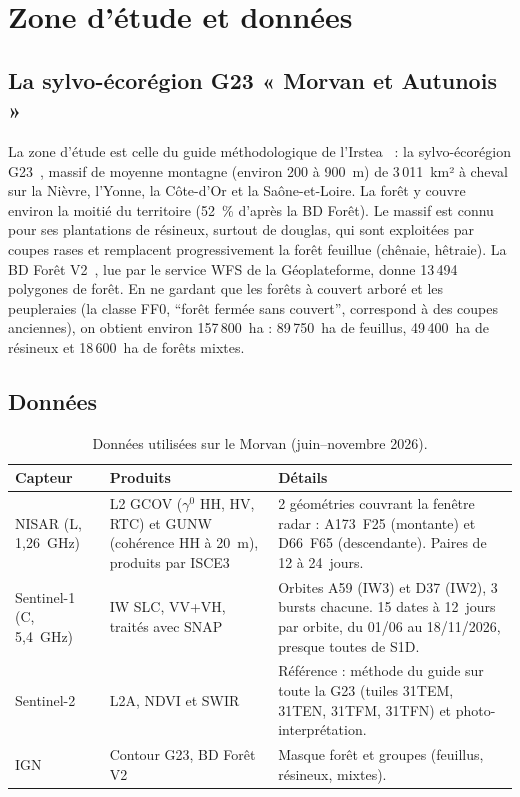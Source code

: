 \section{Zone d'étude et données}

\subsection{La sylvo-écorégion G23 « Morvan et Autunois »}

La zone d'étude est celle du guide méthodologique de l'Irstea~\cite{ose2015guide} : la sylvo-écorégion
G23~\cite{ign2011ser}, massif de moyenne montagne (environ 200 à 900~m) de 3\,011~km² à cheval sur la Nièvre, l'Yonne, la
Côte-d'Or et la Saône-et-Loire. La forêt y couvre environ la moitié du territoire (52~\% d'après la BD Forêt). Le massif est connu pour ses
plantations de résineux, surtout de douglas, qui sont exploitées par coupes rases et remplacent progressivement la
forêt feuillue (chênaie, hêtraie). La BD Forêt V2~\cite{ign2024bdforet}, lue par le service WFS de la
Géoplateforme, donne 13\,494 polygones de forêt. En ne gardant que les forêts à couvert arboré et les peupleraies
(la classe FF0, \enquote{forêt fermée sans couvert}, correspond à des coupes anciennes), on obtient environ
157\,800~ha : 89\,750~ha de feuillus, 49\,400~ha de résineux et 18\,600~ha de forêts mixtes.

\subsection{Données}

\begin{table}[htbp]
\centering\small
\caption{Données utilisées sur le Morvan (juin--novembre 2026).}
\label{tab-data}
\begin{tabular}{p{2.7cm}p{5.4cm}p{6.7cm}}
\toprule
Capteur & Produits & Détails \\
\midrule
NISAR (L, 1,26~GHz) & L2 GCOV ($\gamma^0$ HH, HV, RTC) et GUNW (cohérence HH à 20~m), produits par
ISCE3~\cite{isce3} & 2 géométries couvrant la fenêtre radar : A173~F25 (montante) et D66~F65 (descendante). Paires
de 12 à 24~jours. \\
Sentinel-1 (C, 5,4~GHz) & IW SLC, VV+VH, traités avec SNAP~\cite{snap} & Orbites A59 (IW3) et D37 (IW2), 3 bursts
chacune. 15 dates à 12~jours par orbite, du 01/06 au 18/11/2026, presque toutes de S1D. \\
Sentinel-2~\cite{drusch2012sentinel2} & L2A, NDVI et SWIR & Référence : méthode du guide sur toute la G23 (tuiles
31TEM, 31TEN, 31TFM, 31TFN) et photo-interprétation. \\
IGN & Contour G23, BD Forêt V2 & Masque forêt et groupes (feuillus, résineux, mixtes). \\
\bottomrule
\end{tabular}
\end{table}

